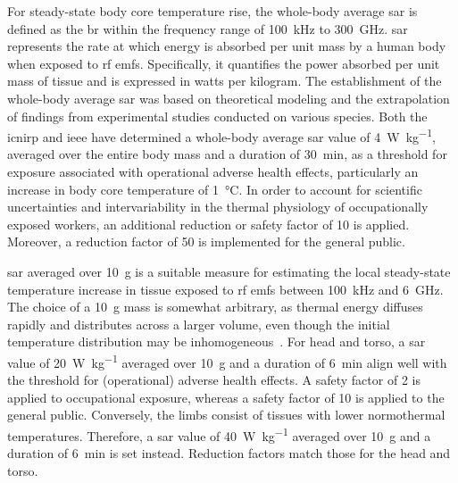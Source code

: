 For steady-state body core temperature rise, the whole-body average \gls{sar} is defined as the \gls{br} within the frequency range of \SI{100}{\kHz} to \SI{300}{\GHz}.
\Gls{sar} represents the rate at which energy is absorbed per unit mass by a human body when exposed to \gls{rf} \gls{emf}s.
Specifically, it quantifies the power absorbed per unit mass of tissue and is expressed in watts per kilogram.
The establishment of the whole-body average \gls{sar} was based on theoretical modeling and the extrapolation of findings from experimental studies conducted on various species.
Both the \gls{icnirp} and \gls{ieee} have determined a whole-body average \gls{sar} value of \SI{4}{\watt\per\kg}, averaged over the entire body mass and a duration of \SI{30}{\minute}, as a threshold for exposure associated with operational adverse health effects, particularly an increase in body core temperature of \SI{1}{\celsius}.
In order to account for scientific uncertainties and intervariability in the thermal physiology of occupationally exposed workers, an additional reduction or safety factor of \num{10} is applied.
Moreover, a reduction factor of \num{50} is implemented for the general public.

\Gls{sar} averaged over \SI{10}{\g} is a suitable measure for estimating the local steady-state temperature increase in tissue exposed to \gls{rf} \gls{emf}s between \SI{100}{\kHz} and \SI{6}{\GHz}.
The choice of a \SI{10}{\g} mass is somewhat arbitrary, as thermal energy diffuses rapidly and distributes across a larger volume, even though the initial temperature distribution may be inhomogeneous~\cite{Hirata2009correlation}.
For head and torso, a \gls{sar} value of \SI{20}{\watt\per\kg} averaged over \SI{10}{\g} and a duration of \SI{6}{\minute} align well with the threshold for (operational) adverse health effects.
A safety factor of \num{2} is applied to occupational exposure, whereas a safety factor of \num{10} is applied to the general public.
Conversely, the limbs consist of tissues with lower normothermal temperatures.
Therefore, a \gls{sar} value of \SI{40}{\watt\per\kg} averaged over \SI{10}{\g} and a duration of \SI{6}{\minute} is set instead.
Reduction factors match those for the head and torso.

